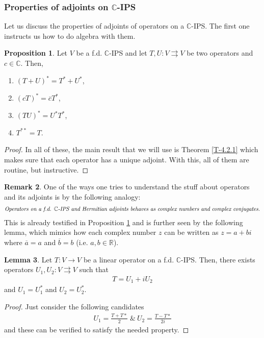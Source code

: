 \documentclass[letterpaper,11pt,twoside]{article}
\theoremstyle{definition}
\newtheorem{proposition}{Proposition}[subsection]
\theoremstyle{definition}
\theoremstyle{definition}
\newtheorem{remark}[proposition]{\textbf{Remark}}
\theoremstyle{definition}
\newtheorem{lemma}[proposition]{\textbf{Lemma}}
\theoremstyle{definition}
\theoremstyle{definition}
\theoremstyle{remark}
\theoremstyle{definition}
\newcommand{\R}[0]{\mathbb{R}}
\newcommand{\conj}[1]{\overline{#1}}
\newcommand{\C}{\mathbb{C}}
\begin{document}
	\subsubsection{Properties of adjoints on $ \C $-IPS}
	Let us discuss the properties of adjoints of operators on a $ \C $-IPS. The first one instructs us how to do algebra with them.
	\begin{proposition}\label{P-4.2.4}
		Let $ V $ be a f.d. $ \C $-IPS and let $ T,U : V\rightrightarrows V $ be two operators and $ c\in \C $. Then,
		\begin{enumerate}
			\item {$ (T+U)^{*} = T^{*} + U^{*} $,}
			\item {$ (cT)^{*} = \conj{c}T^{*} $,}
			\item {$ (TU)^{*} = U^{*}T^{*} $,}
			\item {$ T^{**} = T $.}
		\end{enumerate}
	\end{proposition} 
	\begin{proof}
		In all of these, the main result that we will use is Theorem \ref{T-4.2.1} which makes sure that each operator has a unique adjoint. With this, all of them are routine, but instructive.
	\end{proof}
	\begin{remark}\label{R-4.2.6}
			One of the ways one tries to understand the stuff about operators and its adjoints is by the following analogy:
		\begin{align*}
			\text{\textit{Operators on a f.d. $ \C $-IPS and Hermitian adjoints behaves as complex numbers and complex conjugates.}}
		\end{align*}
		This is already testified in Proposition \ref{P-4.2.4} and is further seen by the following lemma, which mimics how each complex number $ z $ can be written as $ z= a+ bi $ where $ \conj{a} = a $ and $ \conj{b}=b $ (i.e. $ a,b\in \R $).
	\end{remark}
	\begin{lemma}
		Let $ T :V\to V $ be a linear operator on a f.d. $ \C $-IPS. Then, there exists operators $ U_1,U_2 : V\rightrightarrows V $ such that
		\begin{align*}
			T = U_1 + iU_2
		\end{align*}
		and $ U_1 = U_1^{*} $ and $ U_2 = U_2^{*} $.
	\end{lemma}
	\begin{proof}
		Just consider the following candidates
		\begin{align*}
			U_1 = \frac{T + T*}{2}\;\&\: U_2 = \frac{T-T*}{2i}
		\end{align*}
		and these can be verified to satisfy the needed property.
	\end{proof}
\end{document}
